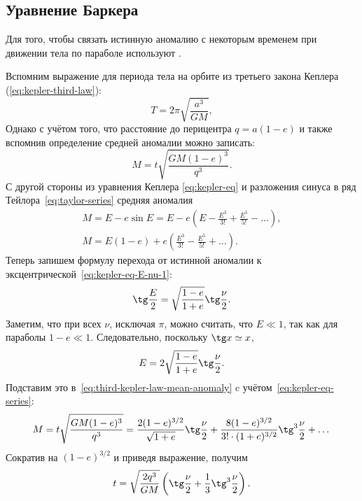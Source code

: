 \subsection{Уравнение Баркера}
Для того, чтобы связать истинную аномалию с некоторым временем при движении тела по параболе используют .

Вспомним выражение для периода тела на орбите из третьего закона Кеплера (\ref{eq:kepler-third-law}):
\begin{equation*}
	T = 2\pi \sqrt{\frac{a^3}{GM}},
\end{equation*}
Однако с учётом того, что расстояние до перицентра  $q = a(1-e)$ и также вспомнив определение средней аномалии можно записать:
\begin{equation}
	M = t \sqrt{\frac{GM(1 - e)^3}{q^3}}.
	\label{eq:third-kepler-law-mean-anomaly}
\end{equation}
С другой стороны из уравнения Кеплера \eqref{eq:kepler-eq} и разложения синуса в ряд Тейлора~\eqref{eq:taylor-series} средняя аномалия
\begin{gather}
	M = E - e \sin E = E - e \left(E - \frac{E^3}{3!} + \frac{E^5}{5!} - \dots\right),\nonumber\\
	M = E(1-e) + e\left(\frac{E^3}{3!} - \frac{E^5}{5!} + \dots \right).
	\label{eq:kepler-eq-series}
\end{gather}
Теперь запишем формулу перехода от истинной аномалии к эксцентрической~\eqref{eq:kepler-eq-E-nu-1}:
\begin{equation*}
	\tg \frac{E}{2} = \sqrt{\frac{1-e}{1+e}} \tg \frac{\nu}{2}.
\end{equation*}
Заметим, что при всех $\nu$, исключая $\pi$, можно считать, что $E \ll 1$, так как для параболы $1-e \ll 1$. Следовательно, поскольку $\tg x \simeq x$,
\begin{equation*}
	E = 2 \sqrt{\frac{1-e}{1+e}} \tg \frac{\nu}{2}.
\end{equation*}
Подставим это в~\eqref{eq:third-kepler-law-mean-anomaly} c учётом~\eqref{eq:kepler-eq-series}:
\begin{equation*}
	M = t \sqrt{\frac{GM(1-e)^3}{q^3}} = \frac{2(1-e)^{3/2}}{\sqrt{1+e}}\tg\frac{\nu}{2} + \frac{8(1-e)^{3/2}}{3! \cdot (1+e)^{3/2}}\tg^3 \frac{\nu}{2} + \dots
\end{equation*}
Сократив на $(1-e)^{3/2}$ и приведя выражение, получим 
\begin{equation}
	t = \sqrt{\frac{2q^3}{GM}}\left(\tg \frac{\nu}{2 } + \frac{1}{3}\tg^3 \frac{\nu}{2}\right).
\end{equation}